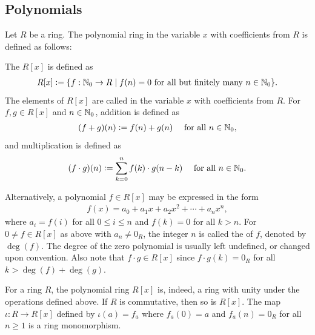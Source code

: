 \subsection{Polynomials}

Let $R$ be a ring. The polynomial ring in the variable $x$ with coefficients from $R$ is defined as follows:
\begin{definition}
    The  $R[x]$ is defined as
    \begin{align}
        R[x] \vcentcolon= \{f:\mathbb{N}_{0} \to R \mid f(n) = 0 \text{ for all but finitely many } n \in \mathbb{N}_{0}\}.
    \end{align}
    The elements of $R[x]$ are called  in the variable $x$ with coefficients from $R$. For $f, g \in R[x]$ and $n \in \mathbb{N}_{0}$, addition is defined as
    \begin{align}
        (f + g)(n) \vcentcolon= f(n) + g(n) \quad \text{ for all } n \in \mathbb{N}_{0},
    \end{align}
    and multiplication is defined as
    \begin{align}
        (f \cdot g)(n) \vcentcolon= \sum_{k=0}^{n} f(k) \cdot g(n-k) \quad \text{ for all } n \in \mathbb{N}_{0}.
    \end{align}
\end{definition}

Alternatively, a polynomial $f \in R[x]$ may be expressed in the form
\begin{align}
    f(x) = a_{0} + a_{1}x + a_{2}x^{2} + \cdots + a_{n}x^{n},
\end{align}
where $a_{i} = f(i)$ for all $0 \leq i \leq n$ and $f(k) = 0$ for all $k > n$. For $0 \neq f \in R[x]$ as above with $a_{n} \neq 0_{R}$, the integer $n$ is called the  of $f$, denoted by $\deg(f)$. The degree of the zero polynomial is usually left undefined, or changed upon convention. Also note that $f \cdot g \in R[x]$ since $f \cdot g(k) = 0_{R}$ for all $k > \deg(f) + \deg(g)$.

\begin{proposition}
    For a ring $R$, the polynomial ring $R[x]$ is, indeed, a ring with unity under the operations defined above. If $R$ is commutative, then so is $R[x]$. The map $\iota : R \to R[x]$ defined by $\iota(a) = f_{a}$ where $f_{a}(0) = a$ and $f_{a}(n) = 0_{R}$ for all $n \geq 1$ is a ring monomorphism.
\end{proposition}

